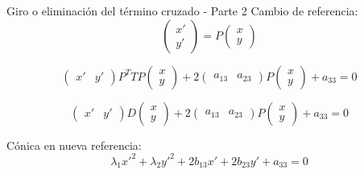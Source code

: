 \documentclass[xcolor={dvipsnames},aspectratio=169,10pt]{beamer}
\begin{document}
\begin{frame}{Giro o eliminación del término cruzado - Parte 2}
  Cambio de referencia:
  \begin{equation*}
    \begin{pmatrix} x' \\ y' \end{pmatrix} = P \begin{pmatrix} x \\ y \end{pmatrix}
  \end{equation*}

  \begin{equation*}
    \begin{pmatrix} x' & y' \end{pmatrix} P^T T P \begin{pmatrix} x \\ y \end{pmatrix} + 2\begin{pmatrix} a_{13} & a_{23} \end{pmatrix} P \begin{pmatrix} x \\ y \end{pmatrix} + a_{33} = 0
  \end{equation*}

  \begin{equation*}
      \begin{pmatrix} x' & y' \end{pmatrix} D \begin{pmatrix} x \\ y \end{pmatrix} + 2\begin{pmatrix} a_{13} & a_{23} \end{pmatrix} P \begin{pmatrix} x \\ y \end{pmatrix} + a_{33} = 0
  \end{equation*}

  Cónica en nueva referencia:
  \begin{equation*}
    \lambda_1x'^2 + \lambda_2y'^2 + 2b_{13}x' + 2b_{23}y' + a_{33} = 0
  \end{equation*}
\end{frame}
\end{document}
